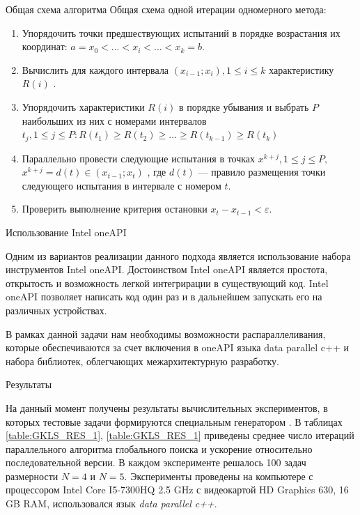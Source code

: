 \documentclass{beamer}
\begin{document}
\begin{frame}[t]
\begin{columns}[t]
\begin{column}[t]{0.47\paperwidth}
\begin{block}{Общая схема алгоритма}
Общая схема одной итерации одномерного метода:
              \begin{enumerate}
                \justifying
                \item Упорядочить точки предшествующих испытаний в порядке возрастания их координат: \(a=x_{0}<...<x_{i}<...<x_{k}=b\).
                \item Вычислить для каждого интервала \((x_{i-1};x_{i}),1\leq i\leq k\)  характеристику \(R(i)\) .
                \item Упорядочить характеристики \(R(i)\) в порядке убывания и выбрать \(P \) наибольших из них с номерами интервалов \(t_{j}, 1\leqslant j \leqslant P: R(t_{1})\geqslant R(t_{2})\geqslant ... \geqslant  R(t_{k-1})\geqslant R(t_{k})\) 
                \item Параллельно провести следующие испытания в точках \(x^{k+j}, 1\leqslant j \leqslant P, \) \(x^{k+j}=d(t)\in (x_{t-1};x_{t})\) , где \(d(t)\)  — правило размещения точки следующего испытания в интервале с номером \(t\).
                \item Проверить выполнение критерия остановки \(x_{t}-x_{t-1}<\varepsilon\).
              \end{enumerate}

\end{block}

\begin{block}{Использование Intel oneAPI}

Одним из вариантов реализации данного подхода является использование набора инструментов Intel oneAPI. Достоинством Intel oneAPI является простота, открытость и возможность легкой интегрирации в существующий код. Intel oneAPI позволяет написать код один раз и в дальнейшем запускать его на различных устройствах. 

В рамках данной задачи нам необходимы возможности распараллеливания, которые обеспечиваются за счет включения в oneAPI языка data parallel c++ и набора библиотек, облегчающих межархитектурную разработку.  


\end{block}

\begin{block}{Результаты}

На данный момент получены результаты вычислительных экспериментов, в которых тестовые задачи формируются специальным генератором \cite{GKLS}. В таблицах \ref{table:GKLS_RES_1}, \ref{table:GKLS_RES_1} приведены среднее число итераций параллельного алгоритма глобального поиска и ускорение относительно последовательной версии. В каждом эксперименте решалось 100 задач размерности \(N = 4\) и \(N = 5\). Эксперименты проведены на компьютере с процессором Intel Core I5-7300HQ 2.5 GHz с видеокартой HD Graphics 630, 16 GB RAM, использовался язык \textit{data parallel c++}.



\end{block}
\end{column}
\end{columns}
\end{frame}
\end{document}
